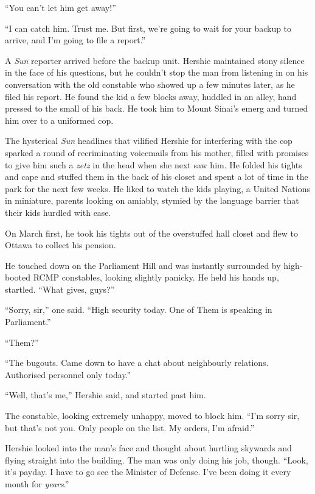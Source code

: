 ``You can't let him get away!''

``I can catch him. Trust me. But first, we're going to wait for your backup to 
arrive, and I'm going to file a report.''

A \emph{Sun} reporter arrived before the backup unit. Hershie
maintained stony silence in the face of his questions, but he
couldn't stop the man from listening in on his conversation with
the old constable who showed up a few minutes later, as he filed
his report. He found the kid a few blocks away, huddled in an
alley, hand pressed to the small of his back. He took him to Mount
Sinai's emerg and turned him over to a uniformed cop.

\tb

The hysterical \emph{Sun} headlines that vilified Hershie for
interfering with the cop sparked a round of recriminating
voicemails from his mother, filled with promises to give him such a
\emph{zetz} in the head when she next saw him. He folded his tights
and cape and stuffed them in the back of his closet and spent a lot
of time in the park for the next few weeks. He liked to watch the
kids playing, a United Nations in miniature, parents looking on
amiably, stymied by the language barrier that their kids hurdled
with ease.

On March first, he took his tights out of the overstuffed hall
closet and flew to Ottawa to collect his pension.

He touched down on the Parliament Hill and was instantly surrounded
by high-booted RCMP constables, looking slightly panicky. He held
his hands up, startled. ``What gives, guys?''

``Sorry, sir,'' one said.
``High security today. One of Them is speaking in Parliament.''

``Them?''

``The bugouts. Came down to have a chat about neighbourly relations. Authorised 
personnel only today.''

``Well, that's me,'' Hershie said, and started past him.

The constable, looking extremely unhappy, moved to block him.
``I'm sorry sir, but that's not you. Only people on the list. My orders, I'm 
afraid.''

Hershie looked into the man's face and thought about hurtling
skywards and flying straight into the building. The man was only
doing his job, though.
``Look, it's payday. I have to go see the Minister of Defense. I've been doing 
it every month for \emph{years}.''

